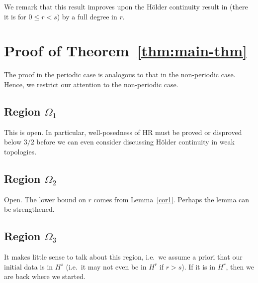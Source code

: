 \documentclass[12pt,reqno]{amsart}
\numberwithin{equation}{section}  %
\numberwithin{figure}{section}
\begin{document}
%
%
%
%
%
%
%
We remark that this result improves upon the H\"older continuity result in
\cite{Chen:2011fk} (there it is for $0 \le r < s$) by a full degree in $r$. 
%
%
%
%
\section{Proof of Theorem~\ref{thm:main-thm}}
%
%
The proof in the periodic case is analogous to that in the non-periodic case.
Hence, we restrict our attention to the non-periodic case. 

%
%
\subsection{Region $\Omega_{1}$} 
\label{ssec:reg-2}
This is open. In particular, well-posedness of HR must be proved or disproved
below $3/2$ before we can even consider discussing H\"older continuity in weak
topologies.
\subsection{Region $\Omega_{2}$} 
\label{ssec:reg-6}
Open. The lower bound on $r$ comes from Lemma~\ref{cor1}. Perhaps the lemma can
be strengthened.
\subsection{Region $\Omega_{3}$} 
\label{ssec:reg-7}
It makes little sense to talk about this region, 
i.e.\ we assume a priori that our initial
data is in $H^{s}$ (i.e.\ it may not even be in $H^{r}$ if $r > s$). If it is in
$H^{r}$, then we are back where we started.
\end{document}

